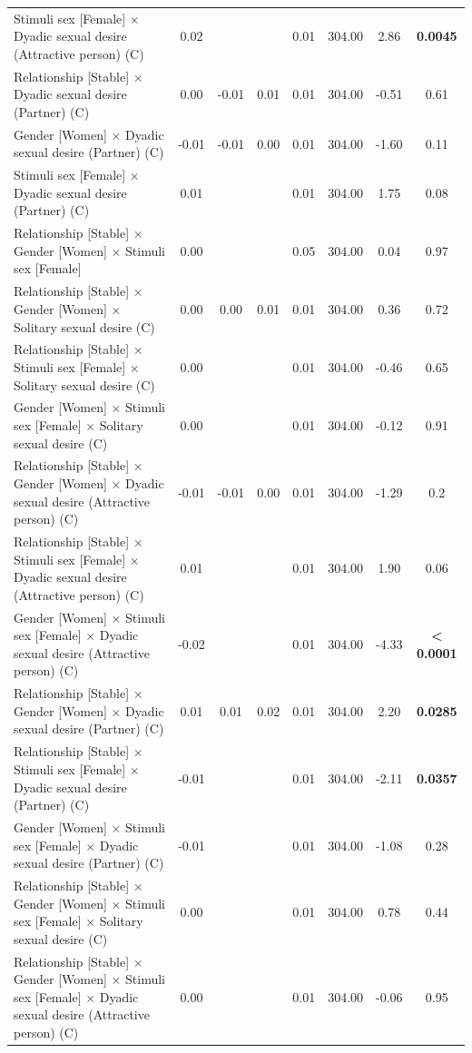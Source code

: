\documentclass[
  bookmarksnumbered]{article}
\begin{document}
\begin{table}[H]
{\begin{threeparttable}
\begin{tabular}[t]{lccccccc}
Stimuli sex [Female] × Dyadic sexual desire (Attractive person) (C) & 0.02 &  &  & 0.01 & 304.00 & 2.86 & \textbf{0.0045}\\
Relationship [Stable] × Dyadic sexual desire (Partner) (C) & 0.00 & -0.01 & 0.01 & 0.01 & 304.00 & -0.51 & 0.61\\
Gender [Women] × Dyadic sexual desire (Partner) (C) & -0.01 & -0.01 & 0.00 & 0.01 & 304.00 & -1.60 & 0.11\\
Stimuli sex [Female] × Dyadic sexual desire (Partner) (C) & 0.01 &  &  & 0.01 & 304.00 & 1.75 & 0.08\\
Relationship [Stable] × Gender [Women] × Stimuli sex [Female] & 0.00 &  &  & 0.05 & 304.00 & 0.04 & 0.97\\
Relationship [Stable] × Gender [Women] × Solitary sexual desire (C) & 0.00 & 0.00 & 0.01 & 0.01 & 304.00 & 0.36 & 0.72\\
Relationship [Stable] × Stimuli sex [Female] × Solitary sexual desire (C) & 0.00 &  &  & 0.01 & 304.00 & -0.46 & 0.65\\
Gender [Women] × Stimuli sex [Female] × Solitary sexual desire (C) & 0.00 &  &  & 0.01 & 304.00 & -0.12 & 0.91\\
Relationship [Stable] × Gender [Women] × Dyadic sexual desire (Attractive person) (C) & -0.01 & -0.01 & 0.00 & 0.01 & 304.00 & -1.29 & 0.2\\
Relationship [Stable] × Stimuli sex [Female] × Dyadic sexual desire (Attractive person) (C) & 0.01 &  &  & 0.01 & 304.00 & 1.90 & 0.06\\
Gender [Women] × Stimuli sex [Female] × Dyadic sexual desire (Attractive person) (C) & -0.02 &  &  & 0.01 & 304.00 & -4.33 & \textbf{< 0.0001}\\
Relationship [Stable] × Gender [Women] × Dyadic sexual desire (Partner) (C) & 0.01 & 0.01 & 0.02 & 0.01 & 304.00 & 2.20 & \textbf{0.0285}\\
Relationship [Stable] × Stimuli sex [Female] × Dyadic sexual desire (Partner) (C) & -0.01 &  &  & 0.01 & 304.00 & -2.11 & \textbf{0.0357}\\
Gender [Women] × Stimuli sex [Female] × Dyadic sexual desire (Partner) (C) & -0.01 &  &  & 0.01 & 304.00 & -1.08 & 0.28\\
Relationship [Stable] × Gender [Women] × Stimuli sex [Female] × Solitary sexual desire (C) & 0.00 &  &  & 0.01 & 304.00 & 0.78 & 0.44\\
Relationship [Stable] × Gender [Women] × Stimuli sex [Female] × Dyadic sexual desire (Attractive person) (C) & 0.00 &  &  & 0.01 & 304.00 & -0.06 & 0.95\\

\end{tabular}
\end{threeparttable}}
\end{table}
\end{document}
